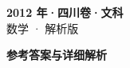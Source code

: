 \documentclass[zihao=-4, a4paper]{ctexart}
\begin{document}
\begin{center}
  {\Large\bfseries 2012 年·四川卷·文科}\\[4pt]
  {\large 数学 · 解析版}
\end{center}
\medskip
{}

\clearpage
{}
\begin{center}{\Large\bfseries 参考答案与详细解析}\end{center}
\medskip

\end{document}
